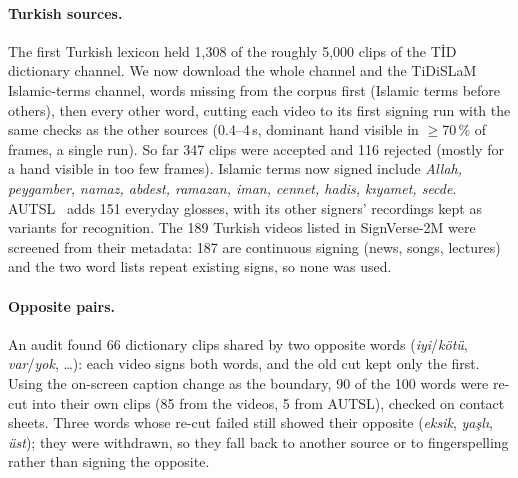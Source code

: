 \paragraph{Turkish sources.} The first Turkish lexicon held 1,308 of the roughly 5,000 clips of the T\.{I}D dictionary
channel. We now download the whole channel and the TiDiSLaM Islamic-terms channel, words missing from the corpus first (Islamic
terms before others), then every other word, cutting each video to its first signing run with the same checks as the other
sources (0.4--4\,s, dominant hand visible in $\ge$70\,\% of frames, a single run). So far 347 clips were accepted and 116
rejected (mostly for a hand visible in too few frames). Islamic terms now signed include \textit{Allah, peygamber, namaz, abdest, ramazan,
iman, cennet, hadis, k\i{}yamet, secde}. AUTSL~\cite{autsl} adds 151 everyday glosses, with its other signers' recordings kept as
variants for recognition. The 189 Turkish videos listed in SignVerse-2M were screened from their metadata: 187 are continuous
signing (news, songs, lectures) and the two word lists repeat existing signs, so none was used.

\paragraph{Opposite pairs.} An audit found 66 dictionary clips shared by two opposite words (\textit{iyi}/\textit{k\"ot\"u},
\textit{var}/\textit{yok}, \ldots): each video signs both words, and the old cut kept only the first. Using the on-screen caption
change as the boundary, 90 of the 100 words were re-cut into their own clips (85 from the videos, 5 from AUTSL), checked on contact
sheets. Three words whose re-cut failed still showed their opposite (\textit{eksik}, \textit{ya\c{s}l\i}, \textit{\"ust}); they
were withdrawn, so they fall back to another source or to fingerspelling rather than signing the opposite.


